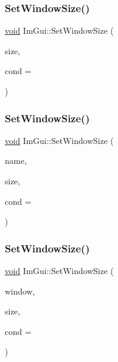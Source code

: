 \mbox{\label{namespaceImGui_a657c6cc2246485332f608a5204447ea1}} 
\subsubsection{\texorpdfstring{Set\+Window\+Size()}{SetWindowSize()}\hspace{0.1cm}{\footnotesize\ttfamily [1/3]}}
{\footnotesize\ttfamily \hyperlink{imgui__impl__opengl3__loader_8h_ac668e7cffd9e2e9cfee428b9b2f34fa7}{void} Im\+Gui\+::\+Set\+Window\+Size (\begin{DoxyParamCaption}\item[{const \hyperlink{structImVec2}{Im\+Vec2} \&}]{size,  }\item[{Im\+Gui\+Cond}]{cond = {} }\end{DoxyParamCaption})}

\mbox{\label{namespaceImGui_a441528b9198d4531e79337121212cd33}} 
\subsubsection{\texorpdfstring{Set\+Window\+Size()}{SetWindowSize()}\hspace{0.1cm}{\footnotesize\ttfamily [2/3]}}
{\footnotesize\ttfamily \hyperlink{imgui__impl__opengl3__loader_8h_ac668e7cffd9e2e9cfee428b9b2f34fa7}{void} Im\+Gui\+::\+Set\+Window\+Size (\begin{DoxyParamCaption}\item[{const char $\ast$}]{name,  }\item[{const \hyperlink{structImVec2}{Im\+Vec2} \&}]{size,  }\item[{Im\+Gui\+Cond}]{cond = {} }\end{DoxyParamCaption})}

\mbox{\label{namespaceImGui_a8a9e750e203a4e4dfac2abd5368f51cf}} 
\subsubsection{\texorpdfstring{Set\+Window\+Size()}{SetWindowSize()}\hspace{0.1cm}{\footnotesize\ttfamily [3/3]}}
{\footnotesize\ttfamily \hyperlink{imgui__impl__opengl3__loader_8h_ac668e7cffd9e2e9cfee428b9b2f34fa7}{void} Im\+Gui\+::\+Set\+Window\+Size (\begin{DoxyParamCaption}\item[{\hyperlink{structImGuiWindow}{Im\+Gui\+Window} $\ast$}]{window,  }\item[{const \hyperlink{structImVec2}{Im\+Vec2} \&}]{size,  }\item[{Im\+Gui\+Cond}]{cond = {} }\end{DoxyParamCaption})}

